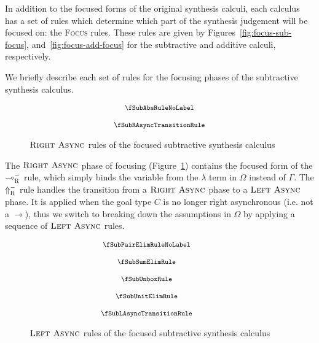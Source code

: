 In addition to the focused forms of the original synthesis calculi, each
calculus has a set of rules which determine which part of the synthesis
judgement will be focused on: the \textsc{Focus} rules. These rules are given by
Figures~\ref{fig:focus-sub-focus}, and~\ref{fig:focus-add-focus} for the
subtractive and additive calculi, respectively.

We briefly describe each set of rules for the focusing phases of the subtractive
synthesis calculus.


\begin{figure}[H]
  \begin{align*}
    {\footnotesize{
\begin{array}{c}
  \fSubAbsRuleNoLabel
  \\[1.25em]
  \fSubRAsyncTransitionRule
  \end{array}
    }}
  \end{align*}
  \caption{$\textsc{Right Async}$ rules of the focused subtractive synthesis calculus}
  \label{fig:focus-sub-right-async}
\end{figure}
The $\textsc{Right Async}$ phase of focusing (Figure~\ref{fig:focus-sub-right-async})
contains the focused form of the $\multimap_\textsc{R}^-$ rule, which simply
binds the variable from the $\lambda$ term in $\Omega$ instead of $\Gamma$. The
$\Uparrow_\textsc{R}^-$ rule handles the transition from a $\textsc{Right Async}$ phase to
a $\textsc{Left Async}$ phase. It is applied when the goal type $C$ is no longer right
asynchronous (i.e. not a $\multimap$), thus we switch to breaking down the
assumptions in $\Omega$ by applying a sequence of $\textsc{Left Async}$ rules.

\begin{figure}[H]
  \begin{align*}
    {\footnotesize{
\hspace{-3.5em}\begin{array}{c}
  \fSubPairElimRuleNoLabel
  \\[1.25em]
  \fSubSumElimRule
  \\[1.25em]
  \fSubUnboxRule
  \\[1.25em]
  \fSubUnitElimRule
  \\[1.25em]
  \fSubLAsyncTransitionRule
  \end{array}
    }}
  \end{align*}
  \caption{$\textsc{Left Async}$ rules of the focused subtractive synthesis calculus}
  \label{fig:focus-sub-left-async}
\end{figure}


